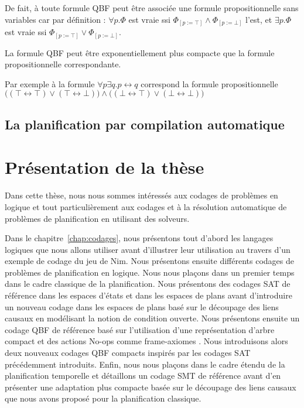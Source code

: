 De fait, à toute formule QBF peut être associée une formule propositionnelle sans variables car par définition : 
$\forall p.\Phi$ est vraie ssi $\Phi_{[p:=\top]} \wedge \Phi_{[p:=\bot]}$ l'est, et $\exists p.\Phi$ est vraie ssi $\Phi_{[p:=\top]} \vee \Phi_{[p:=\bot]}$. 

La formule QBF peut être exponentiellement plus compacte que la formule propositionnelle correspondante. 

Par exemple à la formule $\forall p \exists q.p \leftrightarrow q$ correspond la formule propositionnelle \\
$\Big ( (\top \leftrightarrow \top)\vee (\top \leftrightarrow \bot) \Big ) \wedge \Big ( (\bot \leftrightarrow \top)\vee (\bot \leftrightarrow \bot) \Big )$

\subsection{La planification par compilation automatique}


\section{Présentation de la thèse}

Dans cette thèse, nous nous sommes intéressés aux codages de problèmes en logique et tout particulièrement aux codages et à la résolution automatique de problèmes de planification en utilisant des solveurs.

Dans le chapitre~\ref{chap:codages}, nous présentons tout d'abord les langages logiques que nous allons utiliser avant d'illustrer leur utilisation au travers d'un exemple de codage du jeu de Nim. Nous présentons ensuite différents codages de problèmes de planification en logique. Nous nous plaçons dans un premier temps dans le cadre classique de la planification. Nous présentons des codages SAT de référence dans les espaces d'états \cite{KS92,KS95} et dans les espaces de plans \cite{MK99} avant d'introduire un nouveau codage dans les espaces de plans basé sur le découpage des liens causaux en modélisant la notion de condition ouverte. Nous présentons ensuite un codage QBF de référence basé sur l'utilisation d'une représentation d'arbre compact et des actions No-ops comme frame-axiomes \cite{DBLP:conf/ecai/CashmoreFG12,DBLP:phd/ethos/Cashmore13}. Nous introduisons alors deux nouveaux codages QBF compacts inspirés par les codages SAT précédemment introduits. Enfin, nous nous plaçons dans le cadre étendu de la planification temporelle et détaillons un codage SMT de référence \cite{MarisRegnier08} avant d'en présenter une adaptation plus compacte basée sur le découpage des liens causaux que nous avons proposé pour la planification classique.

